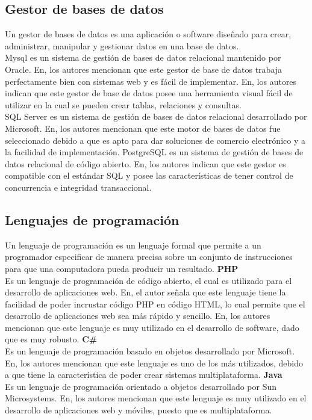 \subsection {Gestor de bases de datos}\label{subsec:gestor-de-bases-de-datos}
Un gestor de bases de datos es una aplicación o software diseñado para crear, administrar, manipular y gestionar datos en una base de datos.\\
Mysql es un sistema de gestión de bases de datos relacional mantenido por Oracle. En\cite{moscayzaSistemaWebPara}, los autores mencionan que este gestor de base de datos trabaja perfectamente bien con sistemas web y es fácil de implementar. En\cite{izaDesarrolloERPPara2023}, los autores indican que este gestor de base de datos posee una herramienta visual fácil de utilizar en la cual se pueden crear tablas, relaciones y consultas.\\
SQL Server es un sistema de gestión de bases de datos relacional desarrollado por Microsoft. En\cite{ortegaAnalisisDisenoImplementacion2017}, los autores mencionan que este motor de bases de datos fue seleccionado debido a que es apto para dar soluciones de comercio electrónico y a la facilidad de implementación.
PostgreSQL es un sistema de gestión de bases de datos relacional de código abierto. En\cite{montalvoDesarrolloSistemaSoftware2023}, los autores indican que este gestor es compatible con el estándar SQL y posee las características de tener control de concurrencia e integridad transaccional.

\subsection{Lenguajes de programación}\label{subsec:lenguajes-de-programacion}
Un lenguaje de programación es un lenguaje formal que permite a un programador especificar de manera precisa sobre un conjunto de instrucciones para que una computadora pueda producir un resultado.
\bigbreak
\textbf {PHP} \\
Es un lenguaje de programación de código abierto, el cual es utilizado para el desarrollo de aplicaciones web. En\cite{moscayzaSistemaWebPara, izaDesarrolloERPPara2023}, el autor señala que este lenguaje tiene la facilidad de poder incrustar código PHP en código HTML, lo cual permite que el desarrollo de aplicaciones web sea más rápido y sencillo. En\cite{izaDesarrolloERPPara2023, ortegaAnalisisDisenoImplementacion2017}, los autores mencionan que este lenguaje es muy utilizado en el desarrollo de software, dado que es muy robusto.
\bigbreak
\textbf{C\#} \\
Es un lenguaje de programación basado en objetos desarrollado por Microsoft. En\cite{ortegaAnalisisDisenoImplementacion2017}, los autores mencionan que este lenguaje es uno de los más utilizados, debido a que tiene la característica de poder crear sistemas multiplataforma.
\bigbreak
\textbf{Java} \\
Es un lenguaje de programación orientado a objetos desarrollado por Sun Microsystems. En\cite{montalvoDesarrolloSistemaSoftware2023, ortegaAnalisisDisenoImplementacion2017}, los autores mencionan que este lenguaje es muy utilizado en el desarrollo de aplicaciones web y móviles, puesto que es multiplataforma.

